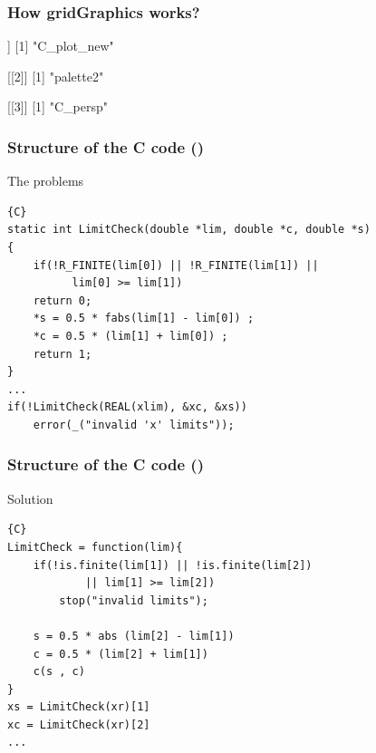 \documentclass{beamer}
\begin{document}

\begin{frame}[fragile]
\frametitle{How \textbf{gridGraphics} works?}
\begin{Schunk}
\begin{Soutput}
[[1]]
[1] "C_plot_new"

[[2]]
[1] "palette2"

[[3]]
[1] "C_persp"
\end{Soutput}
\end{Schunk}
\begin{center}
\end{center}

\end{frame}



\begin{frame}[fragile]
\frametitle{Structure of the \textbf{C} code ()}
\begin{block}{The problems}
\begin{lstlisting}{C}
static int LimitCheck(double *lim, double *c, double *s)
{
    if(!R_FINITE(lim[0]) || !R_FINITE(lim[1]) || 
          lim[0] >= lim[1])
    return 0;
    *s = 0.5 * fabs(lim[1] - lim[0]) ;
    *c = 0.5 * (lim[1] + lim[0]) ;
    return 1;
}
...
if(!LimitCheck(REAL(xlim), &xc, &xs))
	error(_("invalid 'x' limits"));
\end{lstlisting}
\end{block}

\end{frame}



\begin{frame}[fragile]
\frametitle{Structure of the \textbf{C} code ()}
\begin{block}{Solution}
\begin{lstlisting}{C}
LimitCheck = function(lim){
    if(!is.finite(lim[1]) || !is.finite(lim[2]) 
            || lim[1] >= lim[2])
        stop("invalid limits");
      
    s = 0.5 * abs (lim[2] - lim[1])
    c = 0.5 * (lim[2] + lim[1])
    c(s , c)
}
xs = LimitCheck(xr)[1]
xc = LimitCheck(xr)[2]
...
\end{lstlisting}
\end{block}

\end{frame}
\end{document}
